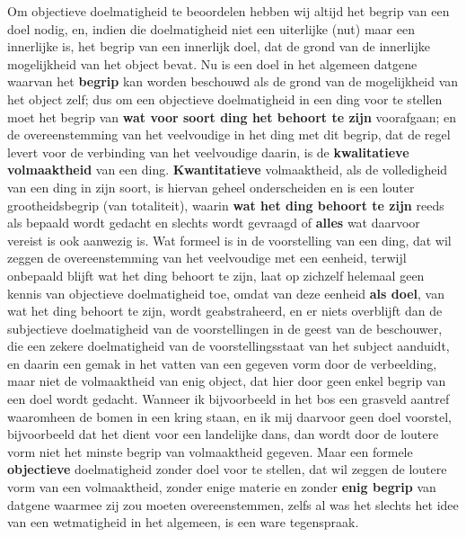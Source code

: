 Om objectieve doelmatigheid te beoordelen hebben wij altijd het begrip van een doel nodig, en, indien die doelmatigheid niet een uiterlijke (nut) maar een innerlijke is, het begrip van een innerlijk doel, dat de grond van de innerlijke mogelijkheid van het object bevat. Nu is een doel in het algemeen datgene waarvan het \textbf{begrip} kan worden beschouwd als de grond van de mogelijkheid van het object zelf; dus om een objectieve doelmatigheid in een ding voor te stellen moet het begrip van \textbf{wat voor soort ding het behoort te zijn} voorafgaan; en de overeenstemming van het veelvoudige in het ding met dit begrip, dat de regel levert voor de verbinding van het veelvoudige daarin, is de \textbf{kwalitatieve volmaaktheid} van een ding. \textbf{Kwantitatieve} volmaaktheid, als de volledigheid van een ding in zijn soort, is hiervan geheel onderscheiden en is een louter grootheidsbegrip (van totaliteit), waarin \textbf{wat het ding behoort te zijn} reeds als bepaald wordt gedacht en slechts wordt gevraagd of \textbf{alles} wat daarvoor vereist is ook aanwezig is. Wat formeel is in de voorstelling van een ding, dat wil zeggen de overeenstemming van het veelvoudige met een eenheid, terwijl onbepaald blijft wat het ding behoort te zijn, laat op zichzelf helemaal geen kennis van objectieve doelmatigheid toe, omdat van deze eenheid \textbf{als doel}, van wat het ding behoort te zijn, wordt geabstraheerd, en er niets overblijft dan de subjectieve doelmatigheid van de voorstellingen in de geest van de beschouwer, die een zekere doelmatigheid van de voorstellingsstaat van het subject aanduidt, en daarin een gemak in het vatten van een gegeven vorm door de verbeelding, maar niet de volmaaktheid van enig object, dat hier door geen enkel begrip van een doel wordt gedacht. Wanneer ik bijvoorbeeld in het bos een grasveld aantref waaromheen de bomen in een kring staan, en ik mij daarvoor geen doel voorstel, bijvoorbeeld dat het dient voor een landelijke dans, dan wordt door de loutere vorm niet het minste begrip van volmaaktheid gegeven. Maar een formele \textbf{objectieve} doelmatigheid zonder doel voor te stellen, dat wil zeggen de loutere vorm van een volmaaktheid, zonder enige materie en zonder \textbf{enig begrip} van datgene waarmee zij zou moeten overeenstemmen, zelfs al was het slechts het idee van een wetmatigheid in het algemeen, is een ware tegenspraak.

